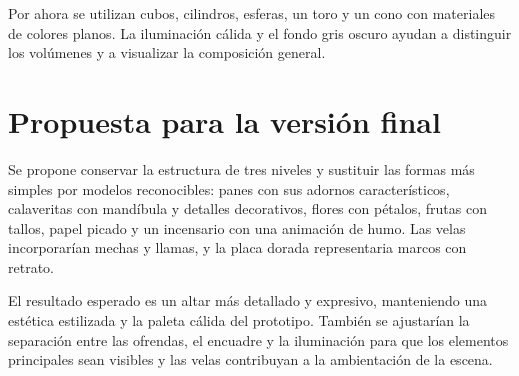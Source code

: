 \documentclass[letter,11pt]{article}
\begin{document}
Por ahora se utilizan cubos, cilindros, esferas, un toro y un cono con
materiales de colores planos. La iluminación cálida y el fondo gris oscuro
ayudan a distinguir los volúmenes y a visualizar la composición general.

\section*{Propuesta para la versión final}
Se propone conservar la estructura de tres niveles y sustituir las formas
más simples por modelos reconocibles: panes con sus adornos característicos,
calaveritas con mandíbula y detalles decorativos, flores con pétalos, frutas
con tallos, papel picado y un incensario con una animación de humo. Las velas incorporarían mechas y
llamas, y la placa dorada representaria marcos con retrato.

El resultado esperado es un altar más detallado y expresivo, manteniendo
una estética estilizada y la paleta cálida del prototipo. También se
ajustarían la separación entre las ofrendas, el encuadre y la iluminación
para que los elementos principales sean visibles y las velas contribuyan
a la ambientación de la escena.
			
\end{document}
